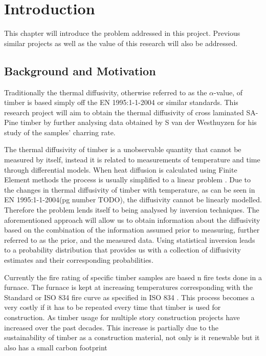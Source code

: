 \chapter{Introduction} \label{introduction}
This chapter will introduce the problem addressed in this project. 
Previous similar projects as well as the value of this research will also be addressed.

\section{Background and Motivation}

Traditionally the thermal diffusivity, otherwise referred to as the $\alpha$-value, of timber is based simply off the EN 1995:1-1-2004 or similar standards.
This research project will aim to obtain the thermal diffusivity of cross laminated SA-Pine timber by further analysing data obtained by S van der Westhuyzen for his study of the samples' charring rate.

The thermal diffusivity of timber is a unobservable quantity that cannot be measured by itself, instead it is related to measurements of temperature and time through differential models. 
When heat diffusion is calculated using Finite Element methods the process is usually simplified to a linear problem \citep{Fish:2007}. 
Due to the changes in thermal diffusivity of timber with temperature, as can be seen in EN 1995:1-1-2004(pg number TODO), the diffusivity cannot be linearly modelled. 
Therefore the problem lends itself to being analysed by inversion techniques. 
The aforementioned approach will allow us to obtain information about the diffusivity based on the combination of the information assumed prior to measuring, further referred to as the prior, and the measured data. 
Using statistical inversion leads to a probability distribution that provides us with a collection of diffusivity estimates and their corresponding probabilities.

Currently the fire rating of specific timber samples are based n fire tests done in a furnace. 
	The furnace is kept at increasing temperatures corresponding with the Standard or ISO 834 fire curve as specified in ISO 834 \citet{ISO:1999}.
	This process becomes a very costly if it has to be repeated every time that timber is used for construction.
	As timber usage for multiple story construction projects have increased over the past decades. 
	This increase is partially due to the sustainability of timber as a construction material, not only is it renewable but it also has a small carbon footprint \citep{Salvadori:2017}
